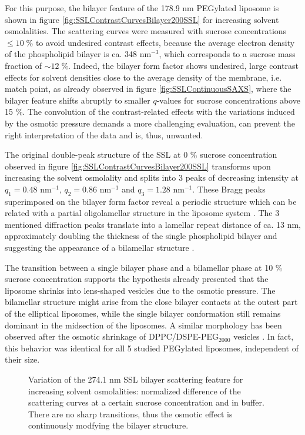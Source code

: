 For this purpose, the bilayer feature of the 178.9 nm PEGylated liposome is shown in figure \ref{fig:SSLContrastCurvesBilayer200SSL} for increasing solvent osmolalities. The scattering curves were measured with sucrose concentrations $\leq10\;\%$ to avoid undesired contrast effects, because the average electron density of the phospholipid bilayer is ca. 348 nm$^{-3}$, which corresponds to a sucrose mass fraction of $\sim 12 \; \%$. Indeed, the bilayer form factor shows undesired, large contrast effects for solvent densities close to the average density of the membrane, i.e. match point, as already observed in figure \ref{fig:SSLContinuousSAXS}, where the bilayer feature shifts abruptly to smaller $q$-values for sucrose concentrations above 15 $\%$. The convolution of the contrast-related effects with the variations induced by the osmotic pressure demands a more challenging evaluation, can prevent the right interpretation of the data and is, thus, unwanted.

The original double-peak structure of the SSL at 0 $\%$ sucrose concentration observed in figure \ref{fig:SSLContrastCurvesBilayer200SSL} transforms upon increasing the solvent osmolality and splits into 3 peaks of decreasing intensity at $q_1=0.48$ nm$^{-1}$, $q_2=0.86$ nm$^{-1}$ and $q_3=1.28$ nm$^{-1}$. These Bragg peaks superimposed on the bilayer form factor reveal a periodic structure which can be related with a partial oligolamellar structure in the liposome system \cite{fernandez_influence_2008}. The 3 mentioned diffraction peaks translate into a lamellar repeat distance of ca. 13 nm, approximately doubling the thickness of the single phospholipid bilayer \cite{kenworthy_range_1995} and suggesting the appearance of a bilamellar structure \cite{deme_giant_2002}. 

The transition between a single bilayer phase and a bilamellar phase at 10 $\%$ sucrose concentration supports the hypothesis already presented that the liposome shrinks into lens-shaped vesicles due to the osmotic pressure. The bilamellar structure might arise from the close bilayer contacts at the outest part of the elliptical liposomes, while the single bilayer conformation still remains dominant in the midsection of the liposomes. A similar morphology has been observed after the osmotic shrinkage of DPPC/DSPE-PEG$_{2000}$ vesicles \cite{terreno_osmotically_2009}. In fact, this behavior was identical for all 5 studied PEGylated liposomes, independent of their size. 

\begin{figure}
	\centering
		
		\caption{Variation of the 274.1 nm SSL bilayer scattering feature for increasing solvent osmolalities: normalized difference of the scattering curves at a certain sucrose concentration and in buffer. There are no sharp transitions, thus the osmotic effect is continuously modfying the bilayer structure.}
		\label{fig:SSLContrastVariationChiSquared400SSL}
\end{figure}

